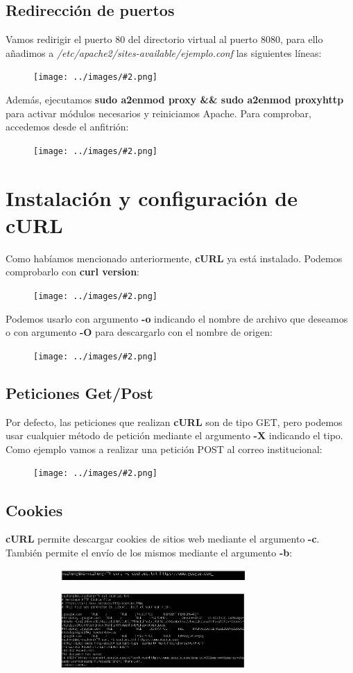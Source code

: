 \documentclass[twoside]{article}
\newcommand{\image}[2]{
\begin{figure}[H]
    \texttt{[image: ../images/\#2.png]}
    \centering
\end{figure}
}
\begin{document}
\subsection{Redirección de puertos}
Vamos redirigir el puerto $80$ del directorio virtual al puerto $8080$, para ello añadimos a \textit{/etc/apache2/sites-available/ejemplo.conf} las siguientes líneas: 
\image{6}{25}
Además, ejecutamos \textbf{sudo a2enmod proxy \&\& sudo a2enmod proxy\textunderscore http} para activar módulos necesarios y reiniciamos Apache. Para comprobar, accedemos desde el anfitrión:
\image{6}{26}

\section{Instalación y configuración de cURL}
Como habíamos mencionado anteriormente, \textbf{cURL} ya está instalado. Podemos comprobarlo con \textbf{curl \textendash\textendash version}:
\image{8}{27}
Podemos usarlo con argumento \textbf{-o} indicando el nombre de archivo que deseamos o con argumento \textbf{-O} para descargarlo con el nombre de origen:
\image{8}{28}

\subsection{Peticiones Get/Post}
Por defecto, las peticiones que realizan \textbf{cURL} son de tipo GET, pero podemos usar cualquier método de petición mediante el argumento \textbf{-X} indicando el tipo. Como ejemplo vamos a realizar una petición POST al correo institucional:
\image{8}{29}

\subsection{Cookies}
\textbf{cURL} permite descargar cookies de sitios web mediante el argumento \textbf{-c}. También permite el envío de los mismos mediante el argumento \textbf{-b}:
\begin{figure}[H]
    \centering
    \begin{subfigure}{.5\textwidth}
        \centering
        \includegraphics[width=7cm]{../images/30.png}
    \end{subfigure}%
    \begin{subfigure}{.5\textwidth}
        \centering
        \includegraphics[width=7cm]{../images/31.png}
    \end{subfigure}
\end{figure}
\end{document}
